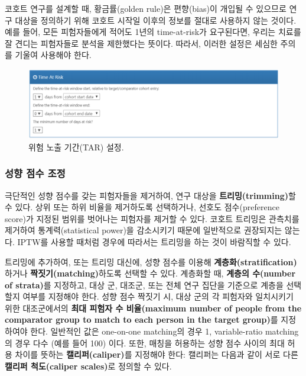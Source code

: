 \documentclass[11pt]{book}
\theoremstyle{definition}
\theoremstyle{definition}
\theoremstyle{definition}
\theoremstyle{remark}
\let\BeginKnitrBlock\begin \let\EndKnitrBlock\end
\begin{document}
\BeginKnitrBlock{rmdimportant}
코호트 연구를 설계할 때, 황금률(golden rule)은 편향(bias)이 개입될 수
있으므로 연구 대상을 정의하기 위해 코호트 시작일 이후의 정보를 절대로
사용하지 않는 것이다. 예를 들어, 모든 피험자들에게 적어도 1년의
time-at-risk가 요구된다면, 우리는 치료를 잘 견디는 피험자들로 분석을
제한했다는 뜻이다. 따라서, 이러한 설정은 세심한 주의를 기울여 사용해야
한다.
\EndKnitrBlock{rmdimportant}

\begin{figure}

{\centering \includegraphics[width=1\linewidth]{images/PopulationLevelEstimation/timeAtRisk} 

}

\caption{위험 노출 기간(TAR) 설정.}\label{fig:timeAtRisk}
\end{figure}

\subsubsection*{성향 점수 조정}\label{--}

극단적인 성향 점수를 갖는 피험자들을 제거하여, 연구 대상을
\textbf{트리밍(trimming)}할 수 있다. 상위 또는 하위 비율을 제거하도록
선택하거나, 선호도 점수(preference score)가 지정된 범위를 벗어나는
피험자를 제거할 수 있다. 코호트 트리밍은 관측치를 제거하여
통계력(statistical power)을 감소시키기 때문에 일반적으로 권장되지는
않는다. IPTW를 사용할 때처럼 경우에 따라서는 트리밍을 하는 것이 바람직할
수 있다. 

트리밍에 추가하여, 또는 트리밍 대신에, 성향 점수를 이용해
\textbf{계층화(stratification)}하거나 \textbf{짝짓기(matching)}하도록
선택할 수 있다. 계층화할 때, \textbf{계층의 수(number of strata)}를
지정하고, 대상 군, 대조군, 또는 전체 연구 집단을 기준으로 계층을
선택할지 여부를 지정해야 한다. 성향 점수 짝짓기 시, 대상 군의 각
피험자와 일치시키기 위한 대조군에서의 \textbf{최대 피험자 수
비율(maximum number of people from the comparator group to match to each
person in the target group)}를 지정하여야 한다. 일반적인 값은 one-on-one
matching의 경우 1, variable-ratio matching의 경우 다수 (예를 들어 100)
이다. 또한, 매칭을 허용하는 성향 점수 사이의 최대 허용 차이를 뜻하는
\textbf{캘리퍼(caliper)}를 지정해야 한다: 캘리퍼는 다음과 같이 서로 다른
\textbf{캘리퍼 척도(caliper scales)}로 정의할 수 있다.
\end{document}
